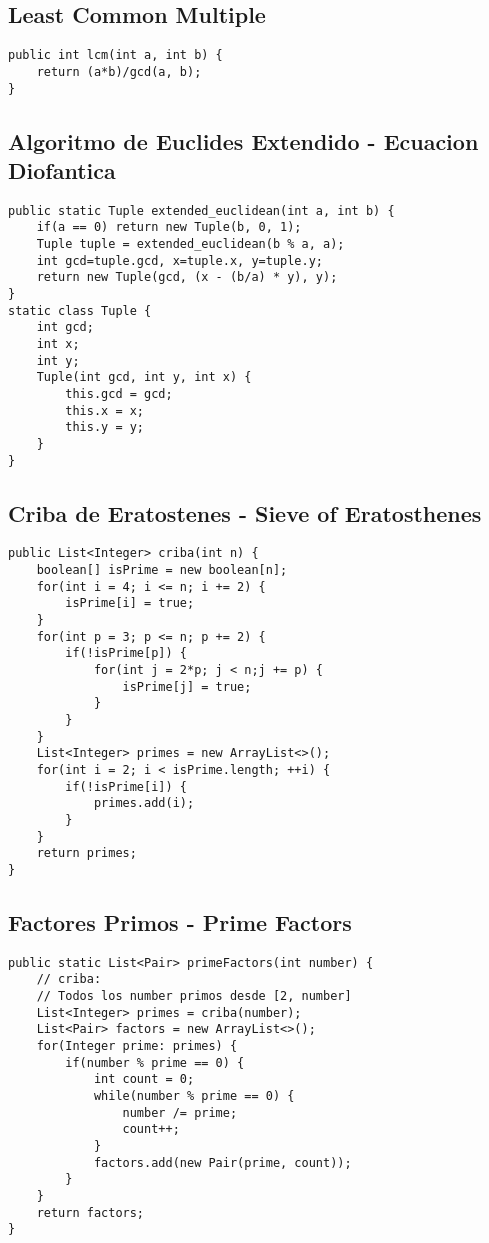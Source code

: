 \documentclass[10pt,letterpaper,twocolumn,twosided]{article}
\begin{document}
\subsection{Least Common Multiple}
\begin{lstlisting}
public int lcm(int a, int b) {  
    return (a*b)/gcd(a, b);  
}
\end{lstlisting}



\subsection{Algoritmo de Euclides Extendido - Ecuacion Diofantica}
\begin{lstlisting}
public static Tuple extended_euclidean(int a, int b) {
    if(a == 0) return new Tuple(b, 0, 1);
    Tuple tuple = extended_euclidean(b % a, a);
    int gcd=tuple.gcd, x=tuple.x, y=tuple.y;
    return new Tuple(gcd, (x - (b/a) * y), y);
}
static class Tuple {
    int gcd;
    int x;
    int y;
    Tuple(int gcd, int y, int x) {
        this.gcd = gcd;
        this.x = x;
        this.y = y;
    }
}
\end{lstlisting}

\subsection{Criba de Eratostenes - Sieve of Eratosthenes}
\begin{lstlisting}
public List<Integer> criba(int n) {
    boolean[] isPrime = new boolean[n];
    for(int i = 4; i <= n; i += 2) {
        isPrime[i] = true;
    }
    for(int p = 3; p <= n; p += 2) {
        if(!isPrime[p]) {
            for(int j = 2*p; j < n;j += p) {
                isPrime[j] = true;
            }
        }
    }
    List<Integer> primes = new ArrayList<>();
    for(int i = 2; i < isPrime.length; ++i) {
        if(!isPrime[i]) {
            primes.add(i);
        }
    }
    return primes;
}
\end{lstlisting}

\subsection{Factores Primos - Prime Factors}
\begin{lstlisting}
public static List<Pair> primeFactors(int number) {
    // criba:
    // Todos los number primos desde [2, number]
    List<Integer> primes = criba(number);
    List<Pair> factors = new ArrayList<>();
    for(Integer prime: primes) {
        if(number % prime == 0) {
            int count = 0;
            while(number % prime == 0) {
                number /= prime;
                count++;
            }
            factors.add(new Pair(prime, count));
        }
    }
    return factors;
}
\end{lstlisting}
\end{document}
